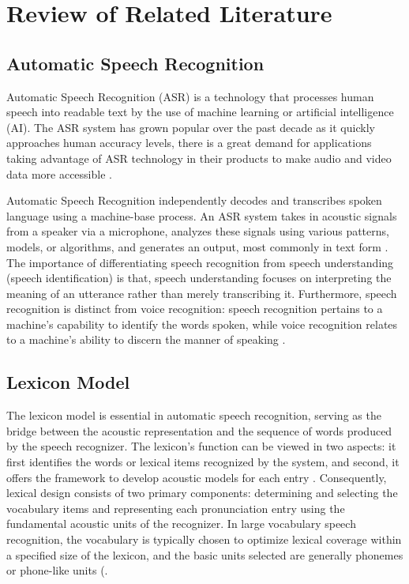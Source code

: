 
\chapter{Review of Related Literature}
\label{sec:relatedlit}


\section{Automatic Speech Recognition}
\label{sec:ASR}

Automatic Speech Recognition (ASR) is a technology that processes human speech into readable text by the use of machine learning or artificial intelligence (AI). The ASR system has grown popular over the past decade as it quickly approaches human accuracy levels, there is a great demand for applications taking advantage of ASR technology in their products to make audio and video data more accessible .

Automatic Speech Recognition independently decodes and transcribes spoken language using a machine-base process. An ASR system takes in acoustic signals from a speaker via a microphone, analyzes these signals using various patterns, models, or algorithms, and generates an output, most commonly in text form . The importance of differentiating speech recognition from speech understanding (speech identification) is that, speech understanding focuses on interpreting the meaning of an utterance rather than merely transcribing it. Furthermore, speech recognition is distinct from voice recognition: speech recognition pertains to a machine's capability to identify the words spoken, while voice recognition relates to a machine's ability to discern the manner of speaking .

\section{Lexicon Model}
\label{sec:LexiconModel}

The lexicon model is essential in automatic speech recognition, serving as the bridge between the acoustic representation and the sequence of words produced by the speech recognizer. The lexicon's function can be viewed in two aspects: it first identifies the words or lexical items recognized by the system, and second, it offers the framework to develop acoustic models for each entry . Consequently, lexical design consists of two primary components: determining and selecting the vocabulary items and representing each pronunciation entry using the fundamental acoustic units of the recognizer. In large vocabulary speech recognition, the vocabulary is typically chosen to optimize lexical coverage within a specified size of the lexicon, and the basic units selected are generally phonemes or phone-like units (.

